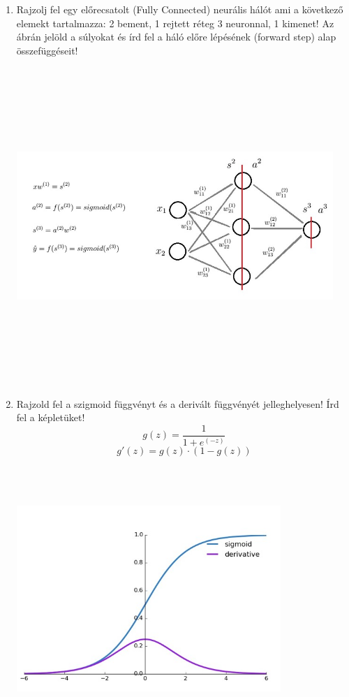 \documentclass[12pt]{article}
\begin{document}
\begin{enumerate}
\item Rajzolj fel egy előrecsatolt (Fully Connected) neurális hálót ami a következő elemekt tartalmazza: 2 bement, 1 rejtett réteg 3 neuronnal, 1 kimenet! Az ábrán jelöld a súlyokat és írd fel a háló előre lépésének (forward step) alap összefüggéseit!

\begin{center}
\includegraphics[width=12cm,height=12cm,keepaspectratio]{./pics/ForwardStep.jpg}
\end{center}
\newpage
\item Rajzold fel a szigmoid függvényt és a derivált függvényét jelleghelyesen! Írd fel a képletüket!
\begin{equation}
g(z)=\frac{1}{1+e^{(-z)}}
\end{equation}
\begin{equation}
g'(z)=g(z)\cdot(1-g(z))
\end{equation}
\begin{center}
\includegraphics[width=10cm,height=10cm,keepaspectratio]{./pics/sigmoid.jpg}
\end{center}


\end{enumerate}
\end{document}
